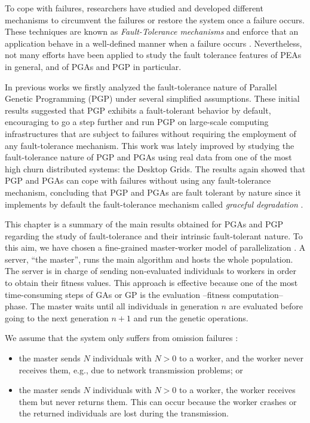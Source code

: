 \documentclass[graybox]{sty/svmult}
\begin{document}
To cope with failures, researchers have studied and developed different mechanisms to circumvent the failures or restore the
system once a failure occurs. These techniques are known as \emph{Fault-Tolerance mechanisms} and enforce that an
application behave in a well-defined manner when a failure occurs \cite{fault-tolerant-async}.
Nevertheless, not many efforts have been applied to study the fault
tolerance features of PEAs in general, and of PGAs and PGP in particular. 

In previous works \cite{cec-2007,gecco-2007-island-model} we firstly analyzed the fault-tolerance nature of Parallel Genetic
Programming (PGP) under several simplified assumptions. These initial results suggested that PGP exhibits a fault-tolerant behavior by
default, encouraging to go a step further and run PGP on large-scale computing infrastructures that are subject to failures
without requiring the employment of any fault-tolerance mechanism. This work was lately improved \cite{bads-2009, jfgcs-2010,
evocop-2010} by studying the fault-tolerance
nature of PGP and PGAs using real data from one of the most high churn
distributed systems: the Desktop Grids. The results again showed that PGP and PGAs can cope
with failures without using any fault-tolerance mechanism, concluding
that PGP and PGAs are fault tolerant by nature since it implements by default
the fault-tolerance mechanism called \emph{graceful degradation}
\cite{distributed-systems}. 

This chapter is a summary of the main results obtained for PGAs and PGP regarding the study of fault-tolerance and their intrinsic fault-tolerant nature.
To this aim, we have chosen a fine-grained master-worker model of parallelization \cite{spatially-structured-EAs}. A server, ``the master'', runs the
main algorithm and hosts the whole population. The server is in charge of sending non-evaluated individuals to workers in
order to obtain their fitness values. This approach is effective because one of the most time-consuming steps of GAs or
GP is the evaluation --fitness computation-- phase. The master waits until all individuals in generation $n$ are evaluated before
going to the next generation $n+1$ and run the genetic operations. 

We assume that the system only suffers from omission failures \cite{distributed-systems}: 
\begin{itemize}
    \item the master sends $N$ individuals with $N>0$ to a worker, and the worker never receives them,
e.g., due to network transmission problems; or
    \item the master sends $N$ individuals with $N>0$ to a worker, the worker receives them but never
returns them. This can occur because the worker crashes or the returned individuals are lost during the transmission.
\end{itemize}   
\end{document}
